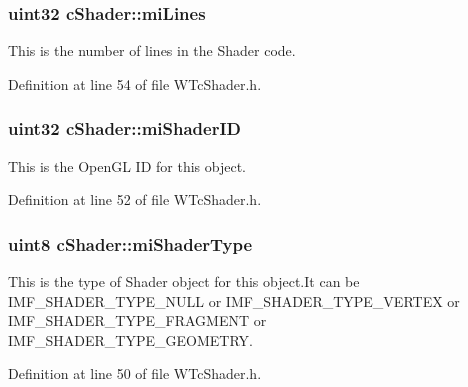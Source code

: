\hypertarget{classc_shader_ab3f9fef98b65463f22225dc44a22824f}{
\subsubsection[{miLines}]{\setlength{\rightskip}{0pt plus 5cm}uint32 {\bf cShader::miLines}}}
\label{classc_shader_ab3f9fef98b65463f22225dc44a22824f}


This is the number of lines in the Shader code. 



Definition at line 54 of file WTcShader.h.

\hypertarget{classc_shader_a52b252fefd228939fbed7d342a3b2054}{
\subsubsection[{miShaderID}]{\setlength{\rightskip}{0pt plus 5cm}uint32 {\bf cShader::miShaderID}}}
\label{classc_shader_a52b252fefd228939fbed7d342a3b2054}


This is the OpenGL ID for this object. 



Definition at line 52 of file WTcShader.h.

\hypertarget{classc_shader_aee3159aac2c9f2eb140a11b8c72fd521}{
\subsubsection[{miShaderType}]{\setlength{\rightskip}{0pt plus 5cm}uint8 {\bf cShader::miShaderType}}}
\label{classc_shader_aee3159aac2c9f2eb140a11b8c72fd521}


This is the type of Shader object for this object.It can be IMF\_\-SHADER\_\-TYPE\_\-NULL or IMF\_\-SHADER\_\-TYPE\_\-VERTEX or IMF\_\-SHADER\_\-TYPE\_\-FRAGMENT or IMF\_\-SHADER\_\-TYPE\_\-GEOMETRY. 



Definition at line 50 of file WTcShader.h.

